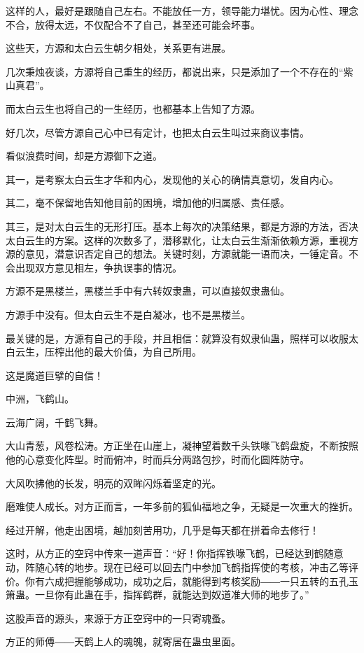 \begin{this_body}
这样的人，最好是跟随自己左右。不能放任一方，领导能力堪忧。因为心性、理念不合，放得太远，不仅配合不了自己，甚至还可能会坏事。

这些天，方源和太白云生朝夕相处，关系更有进展。

几次秉烛夜谈，方源将自己重生的经历，都说出来，只是添加了一个不存在的“紫山真君”。

而太白云生也将自己的一生经历，也都基本上告知了方源。

好几次，尽管方源自己心中已有定计，也把太白云生叫过来商议事情。

看似浪费时间，却是方源御下之道。

其一，是考察太白云生才华和内心，发现他的关心的确情真意切，发自内心。

其二，毫不保留地告知他目前的困境，增加他的归属感、责任感。

其三，是对太白云生的无形打压。基本上每次的决策结果，都是方源的方法，否决太白云生的方案。这样的次数多了，潜移默化，让太白云生渐渐依赖方源，重视方源的意见，潜意识否定自己的想法。关键时刻，方源就能一语而决，一锤定音。不会出现双方意见相左，争执误事的情况。

方源不是黑楼兰，黑楼兰手中有六转奴隶蛊，可以直接奴隶蛊仙。

方源手中没有。但太白云生不是白凝冰，也不是黑楼兰。

最关键的是，方源有自己的手段，并且相信：就算没有奴隶仙蛊，照样可以收服太白云生，压榨出他的最大价值，为自己所用。

这是魔道巨擘的自信！

中洲，飞鹤山。

云海广阔，千鹤飞舞。

大山青葱，风卷松涛。方正坐在山崖上，凝神望着数千头铁喙飞鹤盘旋，不断按照他的心意变化阵型。时而俯冲，时而兵分两路包抄，时而化圆阵防守。

大风吹拂他的长发，明亮的双眸闪烁着坚定的光。

磨难使人成长。对方正而言，一年多前的狐仙福地之争，无疑是一次重大的挫折。

经过开解，他走出困境，越加刻苦用功，几乎是每天都在拼着命去修行！

这时，从方正的空窍中传来一道声音：“好！你指挥铁喙飞鹤，已经达到鹤随意动，阵随心转的地步。现在已经可以回去门中参加飞鹤指挥使的考核，冲击乙等评价。你有六成把握能够成功，成功之后，就能得到考核奖励――一只五转的五孔玉箫蛊。一旦你有此蛊在手，指挥鹤群，就能达到奴道准大师的地步了。”

这股声音的源头，来源于方正空窍中的一只寄魂蚤。

方正的师傅――天鹤上人的魂魄，就寄居在蛊虫里面。


\end{this_body}
